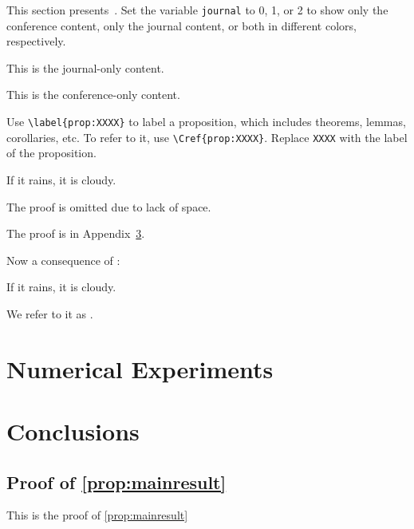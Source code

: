 \documentclass{article}
\begin{document}
\begin{bullets}
    \blt[overview] This section presents~.
    \blt[journal]  Set the variable \texttt{journal} to 0, 1, or 2 to show only the conference content, only the journal content, or both in different colors, respectively.
    \begin{journalonly}
        This is the journal-only content.
    \end{journalonly}
    \begin{conferenceonly}
        This is the conference-only content.
    \end{conferenceonly}
    Use \texttt{\textbackslash label\{prop:XXXX\}} to label a proposition, which includes theorems, lemmas, corollaries, etc. To refer to it, use \texttt{\textbackslash Cref\{prop:XXXX\}}. Replace \texttt{XXXX} with the label of the proposition.

    \begin{theorem}
        \label{prop:mainresult}
        If it rains, it is cloudy.
    \end{theorem}
    \begin{IEEEproof}
        \begin{conferenceonly}
            The proof is omitted due to lack of space.
        \end{conferenceonly}
        \begin{journalonly}
            The proof is in Appendix~\ref{app:proof}.
        \end{journalonly}
    \end{IEEEproof}

    \blt[corollary] Now a consequence of :

    \begin{corollary}
        \label{prop:corollary}
        If it rains, it is cloudy.
    \end{corollary}

    We refer to it as .

\end{bullets}


\section{Numerical Experiments}

\begin{bullets}
\end{bullets}



\section{Conclusions}

\appendices


\begin{journalonly}

    \section{Proof of \cref{prop:mainresult}}
    \label{app:proof}

    This is the proof of \cref{prop:mainresult}
\end{journalonly}

\printmybibliography
\end{document}
